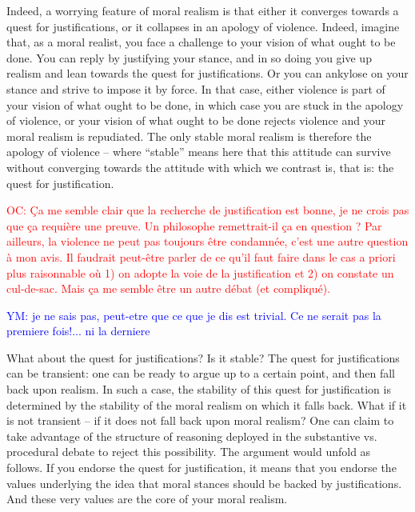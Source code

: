 \documentclass[preprint, french, english, 11pt]{elsarticle}%
\newcommand{\commentYM}[1]{\textcolor{blue}{YM: #1}}
\newcommand{\commentOC}[1]{\textcolor{red}{OC: #1}}
\begin{document}
Indeed, a worrying feature of moral realism is that either it converges towards a quest for justifications, or it collapses in an apology of violence. Indeed, imagine that, as a moral realist, you face a challenge to your vision of what ought to be done. You can reply by justifying your stance, and in so doing you give up realism and lean towards the quest for justifications. Or you can ankylose on your stance and strive to impose it by force. In that case, either violence is part of your vision of what ought to be done, in which case you are stuck in the apology of violence, or your vision of what ought to be done rejects violence and your moral realism is repudiated. The only stable moral realism is therefore the apology of violence -- where ``stable'' means here that this attitude can survive without converging towards the attitude with which we contrast is, that is: the quest for justification.

\commentOC{ Ça me semble clair que la
recherche de justification est bonne, je ne crois pas que ça
requière une preuve. Un philosophe remettrait-il ça en
question ? Par ailleurs, la violence ne peut pas toujours être
condamnée, c’est une autre question à mon avis. Il faudrait
peut-être parler de ce qu’il faut faire dans le cas a priori plus
raisonnable où 1) on adopte la voie de la justification et 2)
on constate un cul-de-sac. Mais ça me semble être un autre
débat (et compliqué).}

\commentYM{je ne sais pas, peut-etre que ce que je dis est trivial. Ce ne serait pas la premiere fois!... ni la derniere}

What about the quest for justifications? Is it stable? The quest for justifications can be transient: one can be ready to argue up to a certain point, and then fall back upon realism. In such a case, the stability of this quest for justification is determined by the stability of the moral realism on which it falls back. What if it is not transient -- if it does not fall back upon moral realism? One can claim to take advantage of the structure of reasoning deployed in the substantive vs. procedural debate to reject this possibility. The argument would unfold as follows. If you endorse the quest for justification, it means that you endorse the values underlying the idea that moral stances should be backed by justifications. And these very values are the core of your moral realism.
\end{document}
